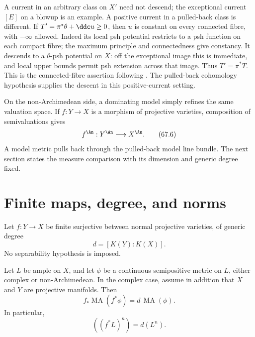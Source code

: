 \begin{remark}
\label{rem:functor-no-inverse-pullback}
A current in an arbitrary class on $X'$ need not descend; the exceptional
current $[E]$ on a blowup is an example. A positive current in a pulled-back
class is different. If $T'=\pi^*\theta+\ddc u\geq0$, then $u$ is constant
on every connected fibre, with $-\infty$ allowed. Indeed its local psh
potential restricts to a psh function on each compact fibre; the maximum
principle and connectedness give constancy. It descends to a $\theta$-psh
potential on $X$: off the exceptional image this is immediate, and local
upper bounds permit psh extension across that image. Thus $T'=\pi^*T$.
This is the connected-fibre assertion following
\cite[Proposition~1.12]{BEGZ10}. The pulled-back cohomology hypothesis
supplies the descent in this positive-current setting.
\end{remark}

On the non-Archimedean side, a dominating model simply refines the
same valuation space. If $f:Y\to X$ is a morphism of projective
varieties, composition of semivaluations gives
\[
                f^{\An}:Y^{\An}\longrightarrow X^{\An}.
\tag{67.6}\label{eq:functor-analytic-map}
\]
A model metric pulls back through the pulled-back model line bundle.
The next section states the measure comparison with its dimension and
generic degree fixed.

\section{Finite maps, degree, and norms}
\label{sec:functor-finite}

Let $f:Y\to X$ be finite surjective between normal projective
varieties, of generic degree
\[
                         d=[K(Y):K(X)].
\tag{67.7}\label{eq:functor-degree}
\]
No separability hypothesis is imposed.

\begin{proposition}\label{prop:functor-finite-ma}
Let $L$ be ample on $X$, and let $\phi$ be a continuous
semipositive metric on $L$, either complex or non-Archimedean. In the
complex case, assume in addition that $X$ and $Y$ are projective
manifolds. Then
\[
        f_*\operatorname{MA}(f^*\phi)
                   =d\,\operatorname{MA}(\phi).
\tag{67.8}\label{eq:functor-finite-ma}
\]
In particular,
\[
                  ((f^*L)^n)=d(L^n).
\tag{67.9}\label{eq:functor-finite-volume}
\]
\end{proposition}

